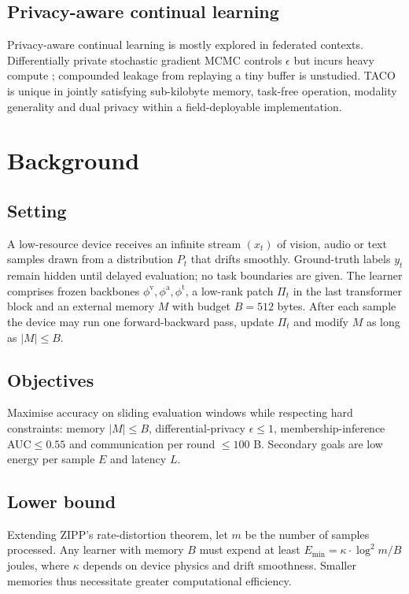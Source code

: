 \documentclass{article}
\begin{document}
\subsection{Privacy-aware continual learning}
Privacy-aware continual learning is mostly explored in federated contexts. Differentially private stochastic gradient MCMC controls $\epsilon$ but incurs heavy compute \cite{chen-2014-stochastic}; compounded leakage from replaying a tiny buffer is unstudied. TACO is unique in jointly satisfying sub-kilobyte memory, task-free operation, modality generality and dual privacy within a field-deployable implementation.

\section{Background}
\subsection{Setting}
A low-resource device receives an infinite stream $(x_t)$ of vision, audio or text samples drawn from a distribution $P_t$ that drifts smoothly. Ground-truth labels $y_t$ remain hidden until delayed evaluation; no task boundaries are given. The learner comprises frozen backbones $\phi^{\mathrm{v}}, \phi^{\mathrm{a}}, \phi^{\mathrm{t}}$, a low-rank patch $\Pi_t$ in the last transformer block and an external memory $M$ with budget $B=512$ bytes. After each sample the device may run one forward-backward pass, update $\Pi_t$ and modify $M$ as long as $|M| \leq B$.

\subsection{Objectives}
Maximise accuracy on sliding evaluation windows while respecting hard constraints: memory $|M|\leq B$, differential-privacy $\epsilon\leq 1$, membership-inference AUC$\leq 0.55$ and communication per round $\leq 100$ B. Secondary goals are low energy per sample $E$ and latency $L$.

\subsection{Lower bound}
Extending ZIPP's rate-distortion theorem, let $m$ be the number of samples processed. Any learner with memory $B$ must expend at least $E_{\min}=\kappa\cdot \log^2 m / B$ joules, where $\kappa$ depends on device physics and drift smoothness. Smaller memories thus necessitate greater computational efficiency.
\end{document}
